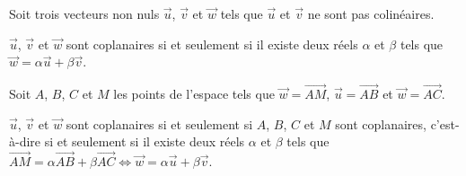\documentclass{cornouaille}
\begin{document}
\begin{propriete}
  \begin{minipage}{.45\linewidth}
    Soit trois vecteurs non nuls $\vec{u}$, $\vec{v}$ et $\vec{w}$
    tels que $\vec{u}$ et $\vec{v}$ ne sont pas colinéaires.

    $\vec{u}$, $\vec{v}$ et $\vec{w}$ sont coplanaires si et seulement
    si il existe deux réels $\alpha$ et $\beta$ tels que\\
    $\vec{w}=\alpha\vec{u}+\beta\vec{v}$.
  \end{minipage}\quad
  \begin{minipage}{.45\linewidth}
  \end{minipage}
\end{propriete}

\begin{preuve}
  Soit $A$, $B$, $C$ et $M$ les points de l'espace tels que
  $\vec{w}=\overrightarrow{AM}$, $\vec{u}=\overrightarrow{AB}$ et
  $\vec{w}=\overrightarrow{AC}$.

  $\vec{u}$, $\vec{v}$ et $\vec{w}$ sont coplanaires si et seulement
  si $A$, $B$, $C$ et $M$ sont coplanaires, c'est-à-dire si et
  seulement si il existe deux réels $\alpha$ et $\beta$ tels que
  $\vec{AM}=\alpha\vec{AB}+\beta\vec{AC}\Leftrightarrow
  \vec{w}=\alpha\vec{u}+\beta\vec{v}$.
\end{preuve}
\end{document}
